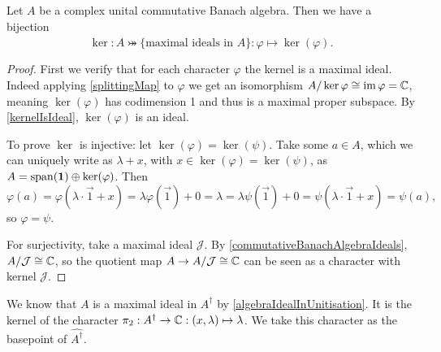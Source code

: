 \begin{proposition} \label{characterMaximalIdealsComplex}
Let $A$ be a complex unital commutative Banach algebra. Then we have a bijection
\[ \ker: \hat{A} \twoheadrightarrowtail \{\text{maximal ideals in $A$}\}: \varphi \mapsto \ker(\varphi).  \]
\end{proposition}
\begin{proof}
First we verify that for each character $\varphi$ the kernel is a maximal ideal. Indeed applying \ref{splittingMap} to $\varphi$ we get an isomorphism $A/\ker\varphi \cong \operatorname{im}\varphi = \mathbb{C}$, meaning $\ker(\varphi)$ has codimension 1 and thus is a maximal proper subspace. By \ref{kernelIsIdeal}, $\ker(\varphi)$ is an ideal.

To prove $\ker$ is injective: let $\ker(\varphi) = \ker(\psi)$. Take some $a\in A$, which we can uniquely write as $\lambda+x$, with $x\in\ker(\varphi) = \ker(\psi)$, as $A = \operatorname{span}(\boldsymbol{\mathrm{1}})\oplus \ker(\varphi)$. Then
\[ \varphi(a) = \varphi(\lambda\cdot\vec{1} + x) = \lambda\varphi(\vec{1}) + 0 = \lambda = \lambda\psi(\vec{1}) + 0 = \psi(\lambda\cdot\vec{1} + x) = \psi(a), \]
so $\varphi = \psi$.

For surjectivity, take a maximal ideal $\mathcal{J}$.
By \ref{commutativeBanachAlgebraIdeals}, $A/\mathcal{J}\cong \mathbb{C}$, so the quotient map $A\to A/\mathcal{J}\cong \mathbb{C}$ can be seen as a character with kernel $\mathcal{J}$.
\end{proof}

\begin{example}
We know that $A$ is a maximal ideal in $A^\dagger$ by \ref{algebraIdealInUnitisation}. It is the kernel of the character $\pi_2: A^\dagger \to \mathbb{C}: (x,\lambda) \mapsto \lambda$. We take this character as the basepoint of $\widehat{A^\dagger}$.
\end{example}


